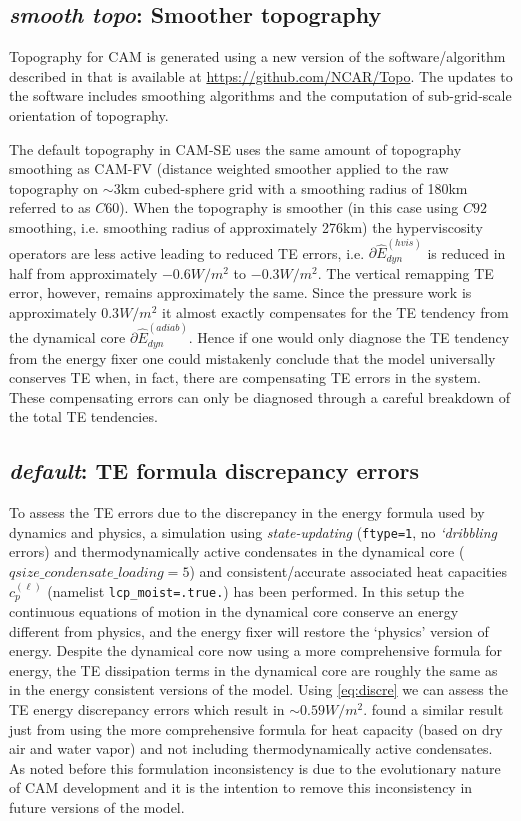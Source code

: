\documentclass[draft,linenumbers]{agujournal}
\newcommand*{\gi}[1]{\widehat{#1}}
\begin{document}
\subsection{{\em{smooth topo}}: Smoother topography}\label{sec:topo}
Topography for CAM is generated using a new version of the software/algorithm described in \cite{LetAl2015GMD} that is available at \url{https://github.com/NCAR/Topo}. The updates to the software includes smoothing algorithms and the computation of sub-grid-scale orientation of topography. 

The default topography in CAM-SE uses the same amount of topography smoothing as CAM-FV (distance weighted smoother applied to the raw topography on $\sim 3$km cubed-sphere grid with a smoothing radius of 180km referred to as $C60$). When the topography is smoother (in this case using $C92$ smoothing, i.e. smoothing radius of approximately 276km) the hyperviscosity operators are less active leading to reduced TE errors, i.e. $\partial \gi{E}^{(hvis)}_{dyn}$ is reduced in half from approximately $-0.6W/m^2$ to $-0.3W/m^2$. The vertical remapping TE error, however, remains approximately the same. Since the pressure work {\color{red}{error}} is approximately $0.3W/m^2$ it almost exactly compensates for the TE tendency from the dynamical core $\partial \gi{E}^{(adiab)}_{dyn}$. Hence if one would only diagnose the TE tendency from the energy fixer one could mistakenly conclude that the model universally  conserves TE when, in fact, there are compensating TE errors in the system. These compensating errors  can only be diagnosed through a careful breakdown of the total TE tendencies.
\subsection{{\em{default}}: TE formula discrepancy errors}\label{sec:ediscr}
To assess the TE errors due to the discrepancy in the energy formula used by dynamics and physics, a simulation using {\em{state-updating}} ({\tt{ftype=1}}, no {\em{`dribbling}} errors) and thermodynamically{\color{red}{/inertially}} active condensates in the dynamical core ($qsize\_condensate\_loading=5$) and consistent/accurate associated heat capacities $c_p^{(\ell)}$ (namelist {\tt{lcp\_moist=.true.}}) has been performed. In this setup the continuous equations of motion in the dynamical core conserve an energy different from physics, and the energy fixer will restore the `physics' version of energy. Despite the dynamical core now using a more comprehensive formula for energy, the TE dissipation terms in the dynamical core are roughly the same as in the energy consistent versions of the model. Using \eqref{eq:discre} we can assess the TE energy discrepancy errors which result in $\sim 0.59W/m^2$. \citet{T2011LNCSEb} found a similar result just from using the more comprehensive formula for heat capacity (based on dry air and water vapor) and not including thermodynamically{\color{red}{/inertially}} active condensates. As noted before this formulation inconsistency is due to the evolutionary nature of CAM development and it is the intention to remove this inconsistency in future versions of the model.
\end{document}
